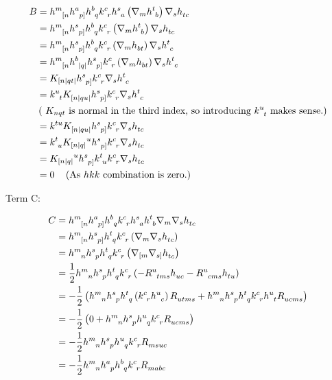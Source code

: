 \begin{align*}
    B &=  \tt{h}{m}{[n} \tt{h}{a}{p]} \tt{h}{b}{q} \tt{k}{c}{r} \tt{h}{s}{a} \lera{ \nabla_m\tt{h}{t}{b}} \nabla_s \tt{h}{}{tc} \\
    &= \tt{h}{m}{[n} \tt{h}{s}{p]} \tt{h}{b}{q} \tt{k}{c}{r}  \lera{ \nabla_m\tt{h}{t}{b}} \nabla_s \tt{h}{}{tc} \\
    &= \tt{h}{m}{[n} \tt{h}{s}{p]} \tt{h}{b}{q} \tt{k}{c}{r}  \lera{ \nabla_m\tt{h}{}{bt}} \nabla_s \tt{h}{t}{c} \\
    &= \tt{h}{m}{[n}\tt{h}{b}{|q|} \tt{h}{s}{p]}  \tt{k}{c}{r}  \lera{ \nabla_m\tt{h}{}{bt}} \nabla_s \tt{h}{t}{c} \\
    &= K_{[n|qt|} \tt{h}{s}{p]} \tt{k}{c}{r} \nabla_s \tt{h}{t}{c} \\
    &=  \tt{k}{u}{t} \tt{K}{}{[n|qu|} \tt{h}{s}{p]} \tt{k}{c}{r}\nabla_s \tt{h}{t}{c} \\
    & \lera{ \text{ $ K_{nqt}$ is normal in the third index, so introducing $ \tt{k}{u}{t}$ makes sense.}}\\
    &=  \tt{k}{tu}{} \tt{K}{}{[n|qu|} \tt{h}{s}{p]} \tt{k}{c}{r}\nabla_s \tt{h}{}{tc} \\ 
    &= \tt{k}{t}{u} K_{[n|q|}{}^{u} \tt{h}{s}{p]} \tt{k}{c}{r} \cov{ \tt{h}{}{tc}}{s} \\
    &=  K_{[n|q|}{}^{u} \tt{h}{s}{p]} \tt{k}{t}{u} \tt{k}{c}{r} \cov{ \tt{h}{}{tc}}{s} \\
    &= 0 \quad\lera{\text{As $hkk$ combination is zero.}}
\end{align*}





Term C:

\begin{align*}
   C&=  \tt{h}{m}{[n} \tt{h}{a}{p]} \tt{h}{b}{q} \tt{k}{c}{r} \tt{h}{s}{a} \tt{h}{t}{b} \nabla_m \nabla_s \tt{h}{}{tc} \\
   &= \tt{h}{m}{[n} \tt{h}{s}{p]}  \tt{h}{t}{q} \tt{k}{c}{r}\lera{ \nabla_m \nabla_s \tt{h}{}{tc}} \\
   &= \tt{h}{m}{n} \tt{h}{s}{p}  \tt{h}{t}{q} \tt{k}{c}{r}\lera{ \nabla_{[m} \nabla_{s]} \tt{h}{}{tc}} \\
   &= \frac{1}{2}  \tt{h}{m}{n} \tt{h}{s}{p}\tt{h}{t}{q} \tt{k}{c}{r} \lera{- \tt{R}{u}{tms} \tt{h}{}{uc}- \tt{R}{u}{cms} \tt{h}{}{tu}} \\
   &= -\frac{1}{2} \lera{\tt{h}{m}{n} \tt{h}{s}{p}\tt{h}{t}{q} \lera{\tt{k}{c}{r} \tt{h}{u}{c}} \tt{R}{}{utms} +\tt{h}{m}{n} \tt{h}{s}{p}\tt{h}{t}{q} \tt{k}{c}{r} \tt{h}{u}{t} \tt{R}{}{ucms}} \\
   &= -\frac{1}{2} \lera{ 0 + \tt{h}{m}{n} \tt{h}{s}{p} \tt{h}{u}{q} \tt{k}{c}{r} \tt{R}{}{ucms} } \\
   &= - \frac{1}{2} \tt{h}{m}{n} \tt{h}{s}{p} \tt{h}{u}{q} \tt{k}{c}{r} \tt{R}{}{msuc} \\
   &= - \frac{1}{2} \tt{h}{m}{n} \tt{h}{a}{p} \tt{h}{b}{q} \tt{k}{c}{r} \tt{R}{}{mabc} 
\end{align*}

